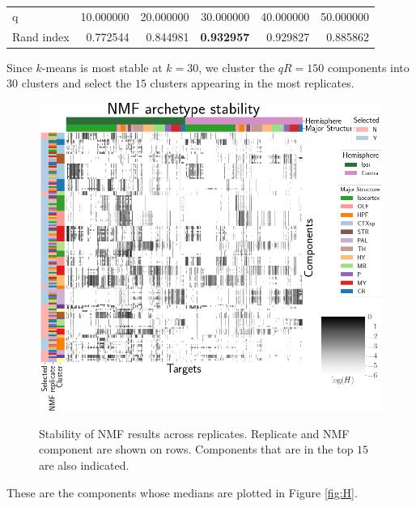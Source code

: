 \begin{tabular}{lrrrrr}
\toprule
q          &  10.000000 &  20.000000 &  30.000000 &  40.000000 &  50.000000 \\
Rand index &   0.772544 &   0.844981 &   \textbf{0.932957} &   0.929827 &   0.885862 \\
\bottomrule
\end{tabular}

Since $k$-means is most stable at $k=30$, we cluster the $qR = 150$ components into $30$ clusters and select the $15$ clusters appearing in the most replicates.
\begin{figure}[H]
    \centering
    \includegraphics[width = 5in]{figs/nmfcluster.png} 
    \label{fig:distances}
    \caption{Stability of NMF results across replicates. 
    Replicate and NMF component are shown on rows.
    Components that are in the top $15$ are also indicated.}
\end{figure}
These are the components whose medians are plotted in Figure \ref{fig:H}.

\newpage

